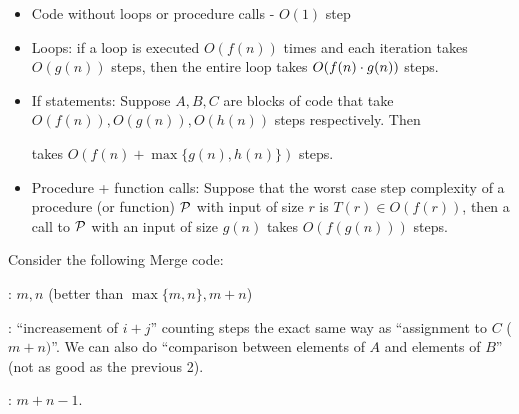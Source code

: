 \documentclass[11pt, cyan, night, 0.5in]{hw}
\begin{document}
\begin{itemize}
    \item Code without loops or procedure calls - $O(1)$ step
    \item Loops: if a loop is executed $O(f(n))$ times and each iteration takes $O(g(n))$ steps, then the entire loop takes $O(f(n)\cd g(n))$ steps.
    \item If statements: Suppose $A,B,C$ are blocks of code that take $O(f(n)), O(g(n)), O(h(n))$ steps respectively. Then 

    \begin{algorithm}
        \begin{algorithmic}
        \end{algorithmic}
    \end{algorithm}

    takes $O(f(n) + \max\{g(n),h(n)\})$ steps.
    \item Procedure + function calls: Suppose that the worst case step complexity of a procedure (or function) $\cal{P}$ with input of size $r$ is $T(r)\in O(f(r))$, then a call to $\cal{P}$ with an input of size $g(n)$ takes $O(f(g(n)))$ steps.
\end{itemize}


\begin{algorithm}
Consider the following Merge code:

    \begin{algorithmic}
    \end{algorithmic}

    : $m,n$ (better than $\max\{m,n\}, m+n$)

    : ``increasement of $i+j$'' counting steps the exact same way as ``assignment to $C$ ($m+n)$''. We can also do ``comparison between elements of $A$ and elements of $B$'' (not as good as the previous 2).

    : $m+n-1$.
\end{algorithm}
\end{document}

